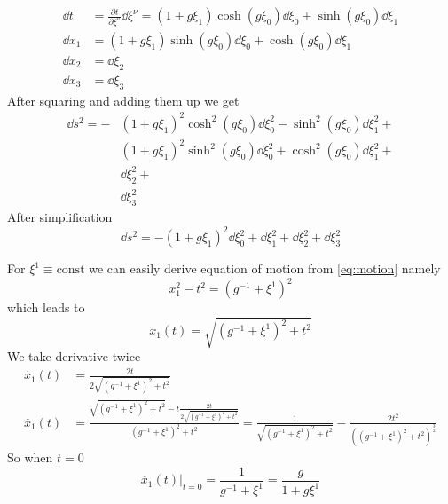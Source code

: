 \begin{align}
	\dd t   & = \frac{\partial t}{\partial \xi^\nu}\dd \xi^\nu =
	(1 + g\xi_1)\cosh(g\xi_0) \dd \xi_0 + \sinh(g\xi_0) \dd \xi_1             \\
	\dd x_1 & = (1 + g\xi_1)\sinh(g\xi_0) \dd \xi_0 + \cosh(g\xi_0) \dd \xi_1 \\
	\dd x_2 & = \dd \xi_2                                                     \\
	\dd x_3 & = \dd \xi_3
\end{align}
After squaring and adding them up we get
%
\begin{align}
	\dd s^2 =  - & (1 + g\xi_1)^2\cosh^2(g\xi_0) \dd \xi_0^2 - \sinh^2(g\xi_0) \dd \xi_1^2 +           \\
	             & (1 + g\xi_1)^2\sinh^2(g\xi_0) \dd \xi_0^2 + \cosh^2(g\xi_0) \dd \xi_1^2 + \nonumber \\
	             & \dd \xi_2^2 +                                                             \nonumber \\
	             & \dd \xi_3^2 \nonumber
\end{align}
After simplification
\begin{equation}
	\boxed{\dd s^2 = -(1+g\xi_1)^2\dd\xi_0^2 + \dd\xi_1^2 + \dd\xi_2^2 + \dd\xi_3^2}
	\label{eq:action}
\end{equation}

\problem

For $\xi^1 \equiv \text{const}$ we can easily derive equation of motion from
\autoref{eq:motion} namely
%
\begin{equation}
	x_1^2 - t^2 = (g^{-1}+\xi^1)^2
\end{equation}
%
which leads to
%
\begin{equation}
	x_1(t) = \sqrt{(g^{-1}+\xi^1)^2 + t^2}
	\label{eq:sqrt}
\end{equation}
%
We take derivative twice
%
\begin{align}
	\dot{x_1}(t)  & = \frac{2t}{2\sqrt{(g^{-1}+\xi^1)^2 + t^2}} \\
	\ddot{x_1}(t) & =
	\frac{\sqrt{(g^{-1}+\xi^1)^2 + t^2} -
		t \frac{2t}{2\sqrt{(g^{-1}+\xi^1)^2 + t^2}}}{(g^{-1}+\xi^1)^2 + t^2} =
	\frac{1}{\sqrt{(g^{-1}+\xi^1)^2 + t^2}} -
	\frac{2t^2}{((g^{-1}+\xi^1)^2 + t^2)^{\frac{3}{2}}}
\end{align}
%
So when $t=0$
%
\begin{equation}
	\boxed{\ddot{x_1}(t)\Big|_{t=0} = \frac{1}{g^{-1}+\xi^1} = \frac{g}{1+g\xi^1}}
\end{equation}


